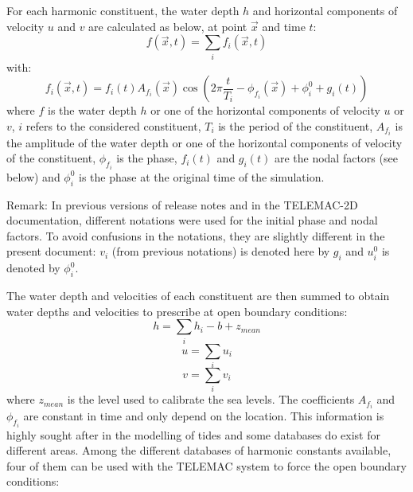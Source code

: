 For each harmonic constituent, the water depth $h$ and horizontal components
of velocity $u$ and $v$ are calculated as below, at point $\vec{x}$ and time $t$:
\begin{equation}
f(\vec{x},t) = \sum_{i} f_{i}(\vec{x},t)
\end{equation}
with:
\begin{equation}
f_{i}(\vec{x},t) = f_{i}(t) A_{f_{i}}(\vec{x}) \cos\left(  2\pi\dfrac{t}{T_{i}} -
\phi_{f_{i}}(\vec{x}) + \phi_{i}^{0} + g_{i}(t)\right)
\end{equation}
where $f$ is the water depth $h$ or one of the horizontal components of
velocity $u$ or $v$, $i$ refers to the considered constituent, $T_{i}$ is the
period of the constituent, $A_{f_{i}}$ is the amplitude of the water depth or
one of the horizontal components of velocity of the constituent, $\phi_{f_{i}}$
is the phase, $f_{i}(t)$ and $g_{i}(t)$ are the nodal factors (see below)
and $\phi_{i}^{0}$ is the phase at the original time of the simulation.

\begin{CommentBlock}{Remark:}
In previous versions of  release notes and in the TELEMAC-2D documentation, different notations were used
for the initial phase and nodal factors. To avoid confusions in the notations,
they are slightly different in the present document: $v_{i}$ (from previous notations)
is denoted here by $g_{i}$ and $u_{i}^{0}$ is denoted by $\phi_{i}^{0}$.
\end{CommentBlock}

The water depth and velocities of each constituent are then summed to obtain water
depths and velocities to prescribe at open boundary conditions:
\begin{equation}
h = \sum_{i} h_{i} - b + z_{mean}
\end{equation}
\begin{equation}
u = \sum_{i} u_{i}
\end{equation}
\begin{equation}
v = \sum_{i} v_{i}
\end{equation}
where $z_{mean}$ is the level used to
calibrate the sea levels. The coefficients $A_{f_{i}}$ and $\phi_{f_{i}}$ are
constant in time and only depend on the location. This information is highly
sought after in the modelling of tides and some databases do exist for
different areas.
Among the different databases of harmonic constants available, four of them
can be used with the TELEMAC system to force the open boundary conditions:


